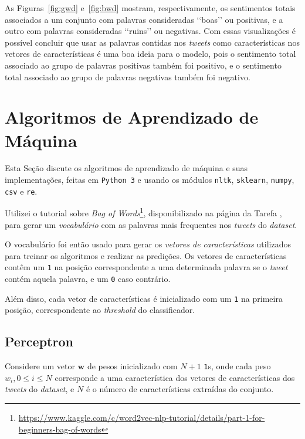 \documentclass[a4paper, 12pt]{article}
\newcommand{\rom}[1]{\uppercase\expandafter{\romannumeral #1\relax}}
\begin{document}
As Figuras~\ref{fig:gwd} e~\ref{fig:bwd} mostram, respectivamente, os
sentimentos totais associados a um conjunto com palavras consideradas
\lq{}\lq{}boas\rq{}\rq{} ou positivas, e a outro com palavras consideradas
\lq{}\lq{}ruins\rq{}\rq{} ou negativas. Com essas visualizações é possível
concluir que usar as palavras contidas nos \textit{tweets} como características
nos vetores de características é uma boa ideia para o modelo, pois o sentimento
total associado ao grupo de palavras positivas também foi positivo, e o
sentimento total associado ao grupo de palavras negativas também foi negativo.

\section{Algoritmos de Aprendizado de Máquina}

Esta Seção discute os algoritmos de aprendizado de máquina
e suas implementações, feitas em \texttt{Python 3} e usando os
módulos \texttt{nltk}, \texttt{sklearn}, \texttt{numpy},
\texttt{csv} e \texttt{re}.

Utilizei o tutorial sobre \textit{Bag of
Words}\footnote{\url{https://www.kaggle.com/c/word2vec-nlp-tutorial/details/part-1-for-beginners-bag-of-words}},
disponibilizado na página da Tarefa \rom{1}, para gerar um \textit{vocabulário}
com as palavras mais frequentes nos \textit{tweets} do \textit{dataset}.

O vocabulário foi então usado para gerar os \textit{vetores de características}
utilizados para treinar os algoritmos e realizar as predições.
Os vetores de características contêm um \texttt{1} na posição
correspondente a uma determinada palavra se o \textit{tweet}
contém aquela palavra, e um \texttt{0} caso contrário.

Além disso, cada vetor de características é inicializado com
um \texttt{1} na primeira posição, correspondente ao
\textit{threshold} do classificador.

\subsection{Perceptron} \label{sec:percep}

Considere um vetor $\boldsymbol{w}$ de pesos inicializado com $N + 1$
\texttt{1}s, onde cada peso $w_i, 0 \leq i \leq N$ corresponde a uma
característica dos vetores de características dos \textit{tweets} do
\textit{dataset}, e $N$ é o número de características extraídas do conjunto.
\end{document}
